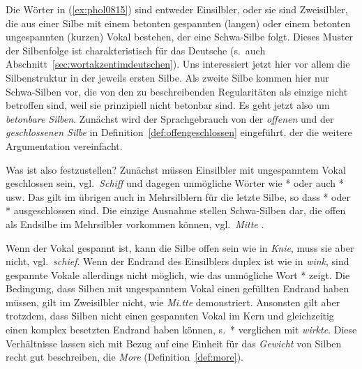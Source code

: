 Die Wörter in (\ref{ex:phol0815}) sind entweder Einsilbler, oder sie sind Zweisilbler, die aus einer Silbe mit einem betonten gespannten (langen) oder einem betonten ungespannten (kurzen) Vokal bestehen, der eine Schwa-Silbe folgt.
Dieses Muster der Silbenfolge ist charakteristisch für das Deutsche (s.\ auch Abschnitt~\ref{sec:wortakzentimdeutschen}).
Uns interessiert jetzt hier vor allem die Silbenstruktur in der jeweils ersten Silbe.
Als zweite Silbe kommen hier nur Schwa-Silben vor, die von den zu beschreibenden Regularitäten als einzige nicht betroffen sind, weil sie prinzipiell nicht betonbar sind.
Es geht jetzt also um \textit{betonbare Silben}.
Zunächst wird der Sprachgebrauch von der \textit{offenen} und der \textit{geschlossenen Silbe} in Definition~\ref{def:offengeschlossen} eingeführt, der die weitere Argumentation vereinfacht.


Was ist also festzustellen?
Zunächst müssen Einsilbler mit ungespanntem Vokal geschlossen sein, vgl.\ \textit{Schiff} und dagegen unmögliche Wörter wie *\textipa{[knI]} oder auch *\textipa{[tO]} usw.
Das gilt im übrigen auch in Mehrsilblern für die letzte Silbe, so dass *\textipa{[kUn.dI]} oder *\textipa{[tu:.pO]} ausgeschlossen sind.
Die einzige Ausnahme stellen Schwa-Silben dar, die offen als Endsilbe im Mehrsilbler vorkommen können, vgl.\ \textit{Mitte} \textipa{[mi.t@]}.

Wenn der Vokal gespannt ist, kann die Silbe offen sein wie in \textit{Knie}, muss sie aber nicht, vgl.\ \textit{schief}.
Wenn der Endrand des Einsilblers duplex ist wie in \textit{wink}, sind gespannte Vokale allerdings nicht möglich, wie das unmögliche Wort *\textipa{[vi:Nk]} zeigt.
Die Bedingung, dass Silben mit ungespanntem Vokal einen gefüllten Endrand haben müssen, gilt im Zweisilbler nicht, wie \textit{Mi.tte} demonstriert.
Ansonsten gilt aber trotzdem, dass Silben nicht einen gespannten Vokal im Kern und gleichzeitig einen komplex besetzten Endrand haben können, s.\ *\textipa{[v\t{i5}k.t@]} verglichen mit \textit{wirkte}.
Diese Verhältnisse lassen sich mit Bezug auf eine Einheit für das \textit{Gewicht} von Silben recht gut beschreiben, die \textit{More} (Definition~\ref{def:more}).


